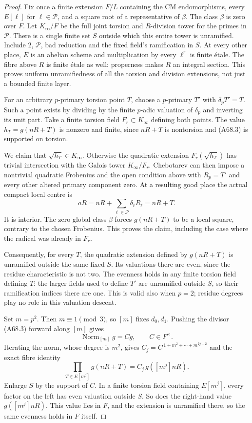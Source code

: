 \begin{proof}
Fix once a finite extension $F/L$
containing the CM endomorphisms,
every $E[\ell]$ for $\ell\in\mathcal P$,
and a square root of a representative
of $\beta$. The class $\beta$
is zero over $F$. Let $K_\infty/F$
be the full joint torsion and
$R$-division tower for the primes
in $\mathcal P$.
There is a single finite set $S$
outside which this entire tower
is unramified. Include $2$,
$\mathcal P$, bad reduction and
the fixed field's ramification
in $S$. At every other place,
$E$ is an abelian scheme and
multiplication by every
$\ell^r$ is finite \'{e}tale.
The fibre above $R$ is finite
\'{e}tale as well: properness
makes $R$ an integral section.
This proves uniform unramifiedness
of all the torsion and division
extensions, not just a bounded
finite layer.

For an arbitrary $p$-primary
torsion point $T$, choose a
$p$-primary $T'$ with
$\delta_pT'=T$. Such a point
exists by dividing by the finite
$p$-adic valuation of $\delta_p$
and inverting its unit part.
Take a finite torsion field
$F_r\subset K_\infty$ defining
both points. The value
$h_T=g(nR+T)$ is nonzero and
finite, since $nR+T$ is
nontorsion and (A68.3) is
supported on torsion.

We claim that $\sqrt{h_T}\in
K_\infty$. Otherwise the
quadratic extension
$F_r(\sqrt{h_T})$ has trivial
intersection with the Galois
tower $K_\infty/F_r$.
Chebotarev can then impose a
nontrivial quadratic Frobenius
and the open condition above
with $R_p=T'$ and every other
altered primary component zero.
At a resulting good place the
actual compact local centre is
\[
 aR=nR+\sum_{\ell\in\mathcal P}
                    \delta_\ell R_\ell
                  =nR+T.
 \tag{A68.4}
\]
It is interior. The zero global
class $\beta$ forces $g(nR+T)$
to be a local square, contrary
to the chosen Frobenius.
This proves the claim, including
the case where the radical was
already in $F_r$.

Consequently, for every $T$,
the quadratic extension defined
by $g(nR+T)$ is unramified
outside the same fixed $S$.
Its valuations there are even,
since the residue characteristic
is not two. The evenness holds
in any finite torsion field
defining $T$: the larger fields
used to define $T'$ are
unramified outside $S$, so their
ramification indices there are
one. This is valid also when
$p=2$; residue degrees play
no role in this valuation
descent.

Set $m=p^2$. Then $m\equiv1
\pmod3$, so $[m]$ fixes $d_0,d_1$.
Pushing the divisor (A68.3)
forward along $[m]$ gives
\[
 \operatorname{Norm}_{[m]}g=Cg,
                      \qquad C\in F^\times.
 \tag{A68.5}
\]
Iterating the norm, whose degree
is $m^2$, gives
$C_j=C^{\,1+m^2+\cdots+m^{2j-2}}$
and the exact fibre identity
\[
 \prod_{T\in E[m^j]}g(nR+T)
                  =C_j\,g([m^j]nR).
 \tag{A68.6}
\]
Enlarge $S$ by the support of
$C$. In a finite torsion field
containing $E[m^j]$, every
factor on the left has even
valuation outside $S$.
So does the right-hand value
$g([m^j]nR)$. This value lies
in $F$, and the extension is
unramified there, so the same
evenness holds in $F$ itself.


\end{proof}
